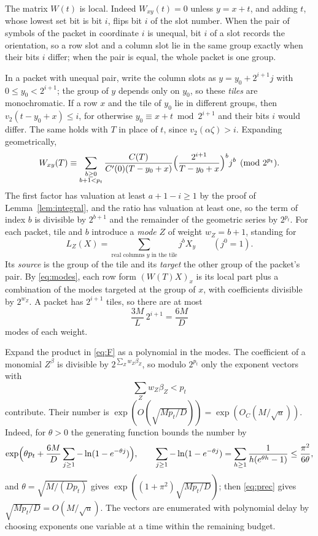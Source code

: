 \documentclass[11pt,reqno]{amsart}
\numberwithin{equation}{section}
\theoremstyle{plain}
\theoremstyle{definition}
\theoremstyle{remark}
\newcommand{\vtwo}{v_2}
\begin{document}
The matrix $W(t)$ is local. Indeed $W_{xy}(t)=0$ unless $y=x+t$, and adding $t$,
whose lowest set bit is bit $i$, flips bit $i$ of the slot number. When the pair
of symbols of the packet in coordinate $i$ is unequal, bit $i$ of a slot
records the orientation, so a row slot and a column slot lie in the same group
exactly when their bits $i$ differ; when the pair is equal, the whole packet is
one group.

In a packet with unequal pair, write the column slots as $y=y_0+2^{i+1}j$ with
$0\le y_0<2^{i+1}$; the group of $y$ depends only on $y_0$, so these
\emph{tiles} are monochromatic. If a row $x$ and the tile of $y_0$ lie in
different groups, then $\vtwo(t-y_0+x)\le i$, for otherwise $y_0\equiv x+t\bmod
2^{i+1}$ and their bits $i$ would differ. The same holds with $T$ in place of $t$,
since $\vtwo(\alpha\zeta)>i$. Expanding geometrically,
\begin{equation}\label{eq:modes}
W_{xy}(T)\equiv\sum_{\substack{b\ge0\\ b+1<p_t}}
\frac{C(T)}{C'(0)(T-y_0+x)}\Bigl(\frac{2^{i+1}}{T-y_0+x}\Bigr)^bj^b
\pmod{2^{p_t}}.
\end{equation}
The first factor has valuation at least $a+1-i\ge1$ by the proof of
Lemma~\ref{lem:integral}, and the ratio has valuation at least one, so the term
of index $b$ is divisible by $2^{b+1}$ and the remainder of the geometric series
by $2^{p_t}$. For each packet, tile and $b$ introduce a \emph{mode} $Z$ of weight
$w_Z=b+1$, standing for
\[
L_Z(X)=\sum_{\text{real columns }y\text{ in the tile}}j^bX_y\qquad(j^0=1).
\]
Its \emph{source} is the group of the tile and its \emph{target} the other group
of the packet's pair. By \eqref{eq:modes}, each row form $(W(T)X)_x$ is its
local part plus a combination of the modes targeted at the group of $x$, with
coefficients divisible by $2^{w_Z}$. A packet has $2^{i+1}$ tiles, so there are at
most
\begin{equation}\label{eq:modecount}
\frac{3M}L\,2^{i+1}=\frac{6M}D
\end{equation}
modes of each weight.

Expand the product in \eqref{eq:F} as a polynomial in the modes. The coefficient
of a monomial $Z^\beta$ is divisible by $2^{\sum_Zw_Z\beta_Z}$, so modulo $2^{p_t}$
only the exponent vectors with
\begin{equation}\label{eq:budget}
\sum_Zw_Z\beta_Z<p_t
\end{equation}
contribute. Their number is $\exp(O(\sqrt{Mp_t/D}))=\exp(O_C(M/\sqrt u))$. Indeed,
for $\theta>0$ the generating function bounds the number by
\[
\exp\Bigl(\theta p_t+\frac{6M}D\sum_{j\ge1}-\ln(1-e^{-\theta j})\Bigr),\qquad
\sum_{j\ge1}-\ln(1-e^{-\theta j})=\sum_{h\ge1}\frac1{h(e^{\theta h}-1)}\le\frac{\pi^2}{6\theta},
\]
and $\theta=\sqrt{M/(Dp_t)}$ gives $\exp((1+\pi^2)\sqrt{Mp_t/D})$; then
\eqref{eq:prec} gives $\sqrt{Mp_t/D}=O(M/\sqrt u)$. The vectors are enumerated
with polynomial delay by choosing exponents one variable at a time within the
remaining budget.
\end{document}
